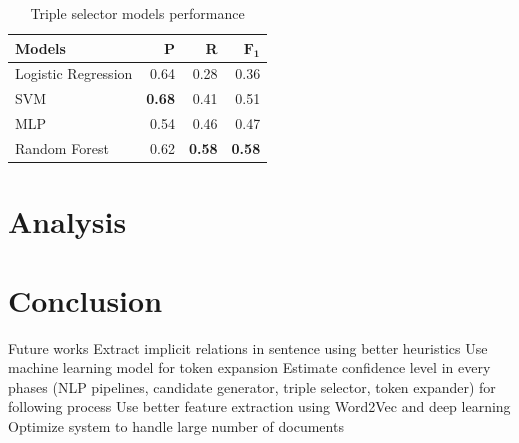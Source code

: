 \documentclass[conference,compsoc]{IEEEtran}
\begin{document}
\begin{table}[!t]
\renewcommand{\arraystretch}{1.5}
\caption{Triple selector models performance}
\label{table_models_performance}
\centering
\begin{tabular}{l r r r}
\hline
\textbf{Models} & \textbf{P} & \textbf{R} & $\mathbf{F_1}$ \\
\hline
Logistic Regression & 0.64 & 0.28 & 0.36 \\
SVM & \textbf{0.68} & 0.41 & 0.51 \\
MLP & 0.54 & 0.46 & 0.47 \\
Random Forest & 0.62 & \textbf{0.58} & \textbf{0.58} \\
\hline
\end{tabular}
\end{table}

\section{Analysis}

\lipsum[6-7]

\section{Conclusion}


Future works
Extract implicit relations in sentence using better heuristics
Use machine learning model for token expansion
Estimate confidence level in every phases (NLP pipelines, candidate generator, triple selector, token expander) for following process
Use better feature extraction using Word2Vec and deep learning
Optimize system to handle large number of documents

\lipsum[6-7]






\end{document}
